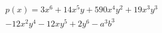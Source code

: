 \begin{multline*}
p(x) = 3x^6 + 14x^5y + 590x^4y^2 + 19x^3y^3\\
- 12x^2y^4 - 12xy^5 + 2y^6 - a^3b^3
\end{multline*}
